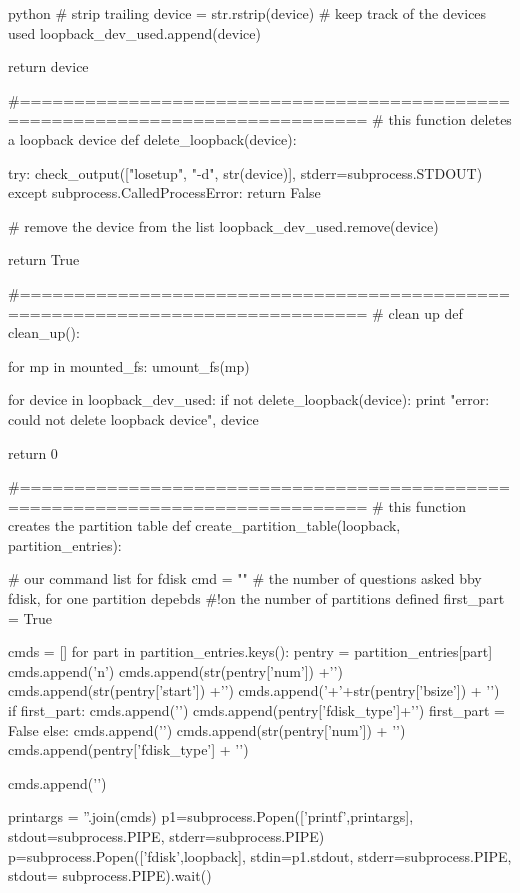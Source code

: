 \begin{code-block}{python}
    # strip trailing \n
    device = str.rstrip(device)
    # keep track of the devices used
    loopback_dev_used.append(device)

    return device

#==============================================================================
# this function deletes a loopback device
def delete_loopback(device):

    try:
        check_output(["losetup", "-d", str(device)], stderr=subprocess.STDOUT)
    except subprocess.CalledProcessError:
        return False

    # remove the device from the list
    loopback_dev_used.remove(device)

    return True

#==============================================================================
# clean up
def clean_up():

    for mp in mounted_fs:
        umount_fs(mp)

    for device in loopback_dev_used:
        if not delete_loopback(device):
            print "error: could not delete loopback device", device


    return 0

#==============================================================================
# this function creates the partition table
def create_partition_table(loopback, partition_entries):

    # our command list for fdisk
    cmd = ""
    # the number of questions asked bby fdisk, for one partition depebds
    #!on the number of partitions defined
    first_part = True

    cmds = []
    for part in partition_entries.keys():
        pentry = partition_entries[part]
        cmds.append('n\np\n')
        cmds.append(str(pentry['num']) +'\n')
        cmds.append(str(pentry['start']) +'\n')
        cmds.append('+'+str(pentry['bsize']) + '\n')
        if first_part:
            cmds.append('\nt\n')
            cmds.append(pentry['fdisk_type']+'\n')
            first_part = False
        else:
            cmds.append('\nt\n')
            cmds.append(str(pentry['num']) + '\n')
            cmds.append(pentry['fdisk_type'] + '\n')

    cmds.append('\nwq\n')

    printargs = ''.join(cmds)
    p1=subprocess.Popen(['printf',printargs],
        stdout=subprocess.PIPE, stderr=subprocess.PIPE)
    p=subprocess.Popen(['fdisk',loopback], stdin=p1.stdout,
        stderr=subprocess.PIPE, stdout= subprocess.PIPE).wait()


\end{code-block}

